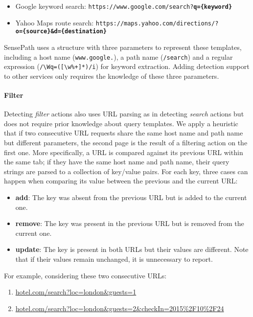 \begin{itemize}
	\item Google keyword search: \texttt{https://www.google.com/search?\textbf{q=\{keyword\}}}
	\item Yahoo Maps route search: \texttt{https://maps.yahoo.com/directions/?\\\textbf{o=\{source\}\&d=\{destination\}}}
\end{itemize}

SensePath uses a structure with three parameters to represent these templates, including a host name (\texttt{www.google.}), a path name (\texttt{/search}) and a regular expression (\verb|/\Wq=([\w%+]*)/i|) for keyword extraction. Adding detection support to other services only requires the knowledge of these three parameters.

\paragraph{Filter}
Detecting \emph{filter} actions also uses URL parsing as in detecting \emph{search} actions but does not require prior knowledge about query templates. We apply a heuristic that if two consecutive URL requests share the same host name and path name but different parameters, the second page is the result of a filtering action on the first one. More specifically, a URL is compared against its previous URL within the same tab; if they have the same host name and path name, their query strings are parsed to a collection of key/value pairs. For each key, three cases can happen when comparing its value between the previous and the current URL:

\begin{itemize}
	\item \textbf{add}: The key was absent from the previous URL but is added to the current one.
	\item \textbf{remove}: The key was present in the previous URL but is removed from the current one.
	\item \textbf{update}: The key is present in both URLs but their values are different. Note that if their values remain unchanged, it is unnecessary to report.
\end{itemize}

For example, considering these two consecutive URLs:
\begin{enumerate}
	\item \url{hotel.com/search?loc=london&guests=1}
	\item \url{hotel.com/search?loc=london&guests=2&checkIn=2015%2F10%2F24}
\end{enumerate}

